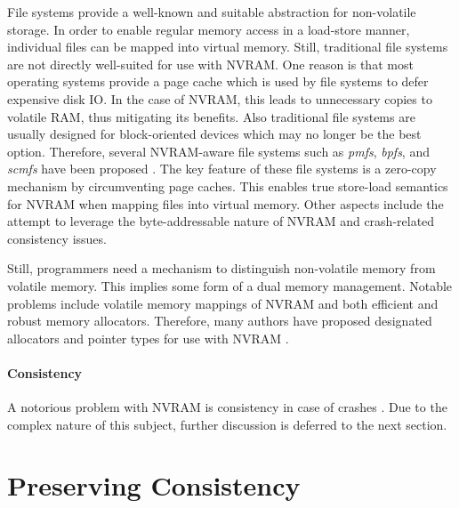 File systems provide a well-known and suitable abstraction for non-volatile
storage. In order to enable regular memory access in a load-store manner,
individual files can be mapped into virtual memory. Still, traditional file
systems are not directly well-suited for use with NVRAM. One reason is that most
operating systems provide a page cache which is used by file systems to defer
expensive disk IO. In the case of NVRAM, this leads to unnecessary copies to
volatile RAM, thus mitigating its benefits. Also traditional file systems are
usually designed for block-oriented devices which may no longer be the best
option. Therefore, several NVRAM-aware file systems such as \emph{pmfs},
\emph{bpfs}, and \emph{scmfs} have been proposed \cite{condit2009better,
wu2011scmfs, dulloor2014system}. The key feature of these file systems is a
zero-copy mechanism by circumventing page caches. This enables true store-load
semantics for NVRAM when mapping files into virtual memory. Other aspects
include the attempt to leverage the byte-addressable nature of NVRAM and
crash-related consistency issues.



Still, programmers need a mechanism to distinguish non-volatile memory from
volatile memory. This implies some form of a dual memory management. Notable
problems include volatile memory mappings of NVRAM and both efficient and robust
memory allocators. Therefore, many authors have proposed designated allocators
and pointer types for use with NVRAM \cite{wu2011scmfs, moraru2013consistent,
oukid2014sofort, schwalb2015nvm_malloc}.


\paragraph{Consistency}

A notorious problem with NVRAM is consistency in case of crashes
\cite{condit2009better, dulloor2014system, oukid2017data}. Due to the complex
nature of this subject, further discussion is deferred to the next section.

\section{Preserving Consistency}

